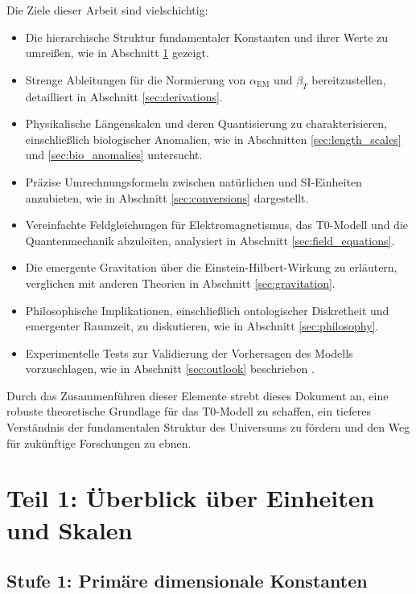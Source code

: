 \documentclass[12pt,a4paper]{article}
\begin{document}
	Die Ziele dieser Arbeit sind vielschichtig:
	\begin{itemize}
		\item Die hierarchische Struktur fundamentaler Konstanten und ihrer Werte zu umreißen, wie in Abschnitt \ref{sec:hierarchy} gezeigt.
		\item Strenge Ableitungen für die Normierung von \(\alpha_{\text{EM}}\) und \(\beta_T\) bereitzustellen, detailliert in Abschnitt \ref{sec:derivations}.
		\item Physikalische Längenskalen und deren Quantisierung zu charakterisieren, einschließlich biologischer Anomalien, wie in Abschnitten \ref{sec:length_scales} und \ref{sec:bio_anomalies} untersucht.
		\item Präzise Umrechnungsformeln zwischen natürlichen und SI-Einheiten anzubieten, wie in Abschnitt \ref{sec:conversions} dargestellt.
		\item Vereinfachte Feldgleichungen für Elektromagnetismus, das T0-Modell und die Quantenmechanik abzuleiten, analysiert in Abschnitt \ref{sec:field_equations}.
		\item Die emergente Gravitation über die Einstein-Hilbert-Wirkung zu erläutern, verglichen mit anderen Theorien in Abschnitt \ref{sec:gravitation}.
		\item Philosophische Implikationen, einschließlich ontologischer Diskretheit und emergenter Raumzeit, zu diskutieren, wie in Abschnitt \ref{sec:philosophy}.
		\item Experimentelle Tests zur Validierung der Vorhersagen des Modells vorzuschlagen, wie in Abschnitt \ref{sec:outlook} beschrieben \cite{pascher_vereinheitlichung_2025}.
	\end{itemize}
	
	Durch das Zusammenführen dieser Elemente strebt dieses Dokument an, eine robuste theoretische Grundlage für das T0-Modell zu schaffen, ein tieferes Verständnis der fundamentalen Struktur des Universums zu fördern und den Weg für zukünftige Forschungen zu ebnen.
	
	\section{Teil 1: Überblick über Einheiten und Skalen}
	\label{sec:hierarchy}
	
	\subsection{Stufe 1: Primäre dimensionale Konstanten}
	\label{subsec:level1}
	
\end{document}
